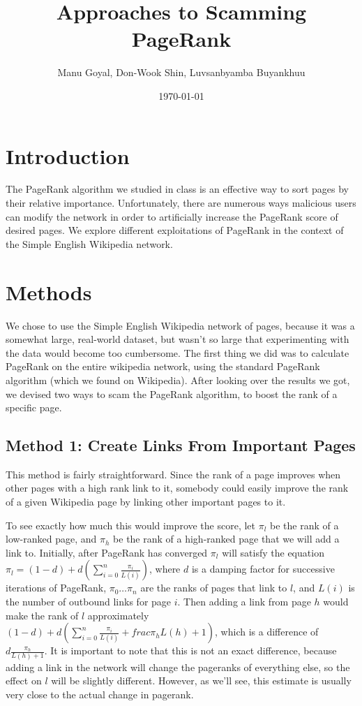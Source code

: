 \documentclass{article}
\title{Approaches to Scamming PageRank}
\author{Manu Goyal, Don-Wook Shin, Luvsanbyamba Buyankhuu}
\date{\today}
\begin{document}
\maketitle

\section*{Introduction}

The PageRank algorithm we studied in class is an effective way to sort pages by
their relative importance. Unfortunately, there are numerous ways malicious
users can modify the network in order to artificially increase the PageRank
score of desired pages. We explore different exploitations of PageRank in the
context of the Simple English Wikipedia network.

\section*{Methods}

We chose to use the Simple English Wikipedia network of pages, because it was a
somewhat large, real-world dataset, but wasn't so large that experimenting with
the data would become too cumbersome. The first thing we did was to calculate
PageRank on the entire wikipedia network, using the standard PageRank algorithm
(which we found on Wikipedia). After looking over the results we got, we devised
two ways to scam the PageRank algorithm, to boost the rank of a specific page.

\subsection*{Method 1: Create Links From Important Pages}

This method is fairly straightforward. Since the rank of a page improves when
other pages with a high rank link to it, somebody could easily improve the rank
of a given Wikipedia page by linking other important pages to it.

To see exactly how much this would improve the score, let $\pi_l$ be the rank of
a low-ranked page, and $\pi_h$ be the rank of a high-ranked page that we will
add a link to. Initially, after PageRank has converged $\pi_l$ will satisfy the
equation $\pi_l = (1 - d) + d(\sum_{i=0}^n \frac{\pi_i}{L(i)})$, where $d$ is a
damping factor for successive iterations of PageRank, $\pi_0 \ldots \pi_n$ are
the ranks of pages that link to $l$, and $L(i)$ is the number of outbound links
for page $i$. Then adding a link from page $h$ would make the rank of $l$
approximately
$(1 - d) + d(\sum_{i=0}^n \frac{\pi_i}{L(i)} + frac{\pi_h}{L(h)+1})$, which is a
difference of $d \frac{\pi_h}{L(h)+1}$. It is important to note that this is not
an exact difference, because adding a link in the network will change the
pageranks of everything else, so the effect on $l$ will be slightly different.
However, as we'll see, this estimate is usually very close to the actual change
in pagerank.
\end{document}
